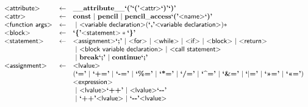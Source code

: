 \begin{figure}
\[\begin{array}{lcl}
  \text{\sf\textless attribute\textgreater} & \gets & \mathbf{\_\_attribute\_\_} \text{\bf`('}\text{\bf`('} \text{\sf\textless attr\textgreater} \text{\bf`)'}\text{\bf`)'}\\

  \text{\sf\textless attr\textgreater} & \gets & \mathbf{const} 
                          ~|~ \mathbf{pencil} 
                          ~|~\mathbf{pencil\_access} \text{\bf`('} \text{\sf\textless name\textgreater} \text{\bf`)'}
\\

  \text{\sf\textless function args\textgreater} & \gets & ~|~ \text{\sf\textless variable declaration\textgreater} (\text{\bf`,'} \text{\sf\textless variable declaration\textgreater})*\\

  \text{\sf\textless block\textgreater} & \gets & \text{\bf`\{'} \text{\sf\textless statement\textgreater} * \text{\bf`\}'}\\

  \text{\sf\textless statement\textgreater} & \gets & \text{\sf\textless assignment\textgreater} \text{\bf`;'}
                               ~|~ \text{\sf\textless for\textgreater}
                               ~|~ \text{\sf\textless while\textgreater}
                               ~|~ \text{\sf\textless if\textgreater}
                               ~|~ \text{\sf\textless block\textgreater}
                               ~|~ \text{\sf\textless return\textgreater}\\ & &
                               ~|~ \text{\sf\textless block variable declaration\textgreater}
                               ~|~ \text{\sf\textless call statement\textgreater}\\ & &
                               ~|~ \mathbf{break} \text{\bf`;'}
                               ~|~ \mathbf{continue} \text{\bf`;'}
  \\

  \text{\sf\textless assignment\textgreater} & \gets & \text{\sf\textless lvalue\textgreater}\\&& (\text{\bf`='}
                                                        ~|~ \text{\bf`+='}
                                                        ~|~ \text{\bf`-='}
                                                        ~|~ \text{\bf`\%='}
                                                        ~|~ \text{\bf`*='}
                                                        ~|~ \text{\bf`/='}
                                                        ~|~ \text{\bf`\textasciicircum='}
                                                        ~|~ \text{\bf`\&='}
                                                        ~|~ \text{\bf`$|$='}
                                                        ~|~ \text{\bf`\textgreater\textgreater='}
                                                        ~|~ \text{\bf`\textless\textless='})\\&&
                                                         \text{\sf\textless expression\textgreater}\\ & &
                                                      ~|~ \text{\sf\textless lvalue\textgreater} \text{\bf`++'}
                                                      ~|~ \text{\sf\textless lvalue\textgreater} \text{\bf`{-}{-}'}\\&&
                                  ~|~\text{\bf`++'} \text{\sf\textless lvalue\textgreater}
                                  ~|~\text{\bf`{-}{-}'} \text{\sf\textless lvalue\textgreater}\\


\end{array}\]
\end{figure}
